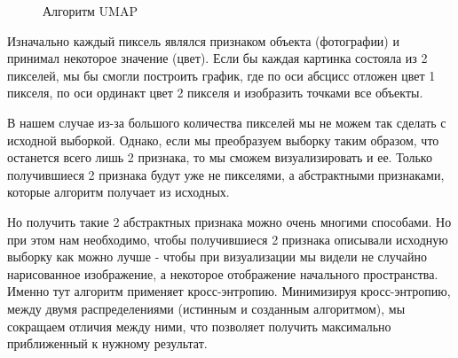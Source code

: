 \begin{itemize}
\begin{figure}[bh]
	\noindent{}
	\caption{Алгоритм UMAP}
	\label{figCurves}
\end{figure}

Изначально каждый пиксель являлся признаком объекта (фотографии) и принимал некоторое значение (цвет). Если бы каждая картинка состояла из 2 пикселей, мы бы смогли построить график, где по оси абсцисс отложен цвет 1 пикселя, по оси ординакт цвет 2 пикселя и изобразить точками все объекты.

В нашем случае из-за большого количества пикселей мы не можем так сделать с исходной выборкой. Однако, если мы преобразуем выборку таким образом, что останется всего лишь 2 признака, то мы сможем визуализировать и ее. Только получившиеся 2 признака будут уже не пикселями, а абстрактными признаками, которые алгоритм получает из исходных.

Но получить такие 2 абстрактных признака можно очень многими способами. Но при этом нам необходимо, чтобы получившиеся 2 признака описывали исходную выборку как можно лучше - чтобы при визуализации мы видели не случайно нарисованное изображение, а некоторое отображение начального пространства. Именно тут алгоритм применяет кросс-энтропию. Минимизируя кросс-энтропию, между двумя распределениями (истинным и созданным алгоритмом), мы сокращаем отличия между ними, что позволяет получить максимально приближенный к нужному результат.
\end{itemize}